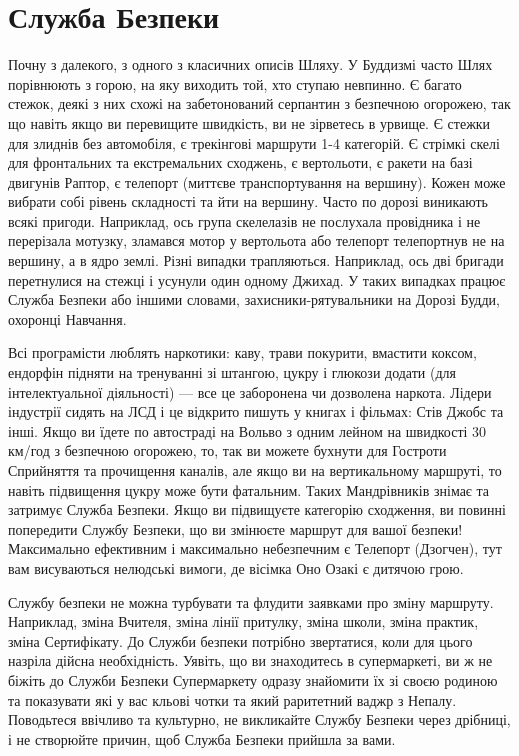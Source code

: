\section{Служба Безпеки}

Почну з далекого, з одного з класичних описів Шляху. У Буддизмі часто
Шлях порівнюють з горою, на яку виходить той, хто ступаю невпинно. Є багато
стежок, деякі з них схожі на забетонований серпантин з безпечною огорожею,
так що навіть якщо ви перевищите швидкість, ви не зірветесь в урвище.
Є стежки для злиднів без автомобіля, є трекінгові маршрути 1-4 категорій.
Є стрімкі скелі для фронтальних та екстремальних сходжень, є вертольоти,
є ракети на базі двигунів Раптор, є телепорт (миттєве транспортування на вершину).
Кожен може вибрати собі рівень складності та йти на вершину.
Часто по дорозі виникають всякі пригоди. Наприклад, ось група скелелазів
не послухала провідника і не перерізала мотузку, зламався мотор
у вертольота або телепорт телепортнув не на вершину, а в ядро землі.
Різні випадки трапляються. Наприклад, ось дві бригади перетнулися на
стежці і усунули один одному Джихад. У таких випадках працює Служба
Безпеки або іншими словами, захисники-рятувальники на Дорозі Будди, охоронці Навчання.

Всі програмісти люблять наркотики: каву, трави покурити, вмастити
коксом, ендорфін підняти на тренуванні зі штангою, цукру і глюкози
додати (для інтелектуальної діяльності) --- все це заборонена чи дозволена наркота.
Лідери індустрії сидять на ЛСД і це відкрито пишуть у книгах і фільмах:
Стів Джобс та інші. Якщо ви їдете по автостраді на Вольво
з одним лейном на швидкості 30 км/год з безпечною огорожею, то,
так ви можете бухнути для Гостроти Сприйняття та прочищення каналів,
але якщо ви на вертикальному маршруті, то навіть підвищення цукру
може бути фатальним. Таких Мандрівників знімає та затримує Служба Безпеки.
Якщо ви підвищуєте категорію сходження, ви повинні попередити Службу Безпеки,
що ви змінюєте маршрут для вашої безпеки! Максимально ефективним і
максимально небезпечним є Телепорт (Дзогчен), тут вам висуваються
нелюдські вимоги, де вісімка Оно Озакі є дитячою грою.

Службу безпеки не можна турбувати та флудити заявками про зміну маршруту.
Наприклад, зміна Вчителя, зміна лінії притулку, зміна школи, зміна практик,
зміна Сертифікату. До Служби безпеки потрібно звертатися, коли
для цього назріла дійсна необхідність. Уявіть, що ви знаходитесь
в супермаркеті, ви ж не біжіть до Служби Безпеки Супермаркету одразу
знайомити їх зі своєю родиною та показувати які у вас кльові чотки
та який раритетний ваджр з Непалу. Поводьтеся ввічливо та культурно,
не викликайте Службу Безпеки через дрібниці, і не створюйте причин,
щоб Служба Безпеки прийшла за вами.

